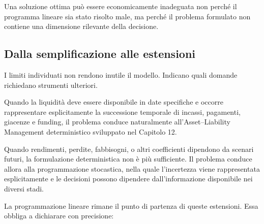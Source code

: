 \begin{remark}

Una soluzione ottima pu\`o essere economicamente inadeguata non perch\'e il
programma lineare sia stato risolto male, ma perch\'e il problema formulato
non contiene una dimensione rilevante della decisione.

\end{remark}

\subsection{Dalla semplificazione alle estensioni}

I limiti individuati non rendono inutile il modello. Indicano quali domande
richiedano strumenti ulteriori.





Quando la liquidit\`a deve essere disponibile in date specifiche e occorre
rappresentare esplicitamente la successione temporale di incassi, pagamenti,
giacenze e funding, il problema conduce naturalmente all'Asset--Liability
Management deterministico sviluppato nel Capitolo 12.

Quando rendimenti, perdite, fabbisogni, o altri coefficienti dipendono da
scenari futuri, la formulazione deterministica non \`e pi\`u sufficiente.
Il problema conduce allora alla programmazione stocastica, nella quale
l'incertezza viene rappresentata esplicitamente e le decisioni possono
dipendere dall'informazione disponibile nei diversi stadi.

La programmazione lineare rimane il punto di partenza di queste estensioni. Essa obbliga a dichiarare con precisione:

